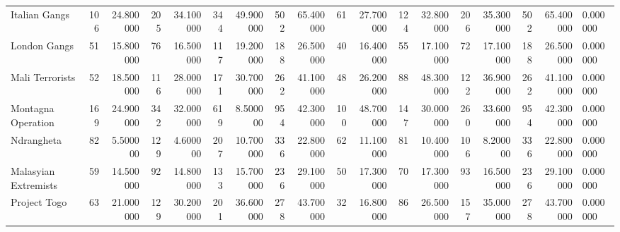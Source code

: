 \begin{tabular}{lrrrrrrrrrrrrrrrrl}
Italian Gangs & 106 & 24.800000 & 205 & 34.100000 & 344 & 49.900000 & 502 & 65.400000 & 61 & 27.700000 & 124 & 32.800000 & 206 & 35.300000 & 502 & 65.400000 & 0.000000 \\
London Gangs & 51 & 15.800000 & 76 & 16.500000 & 117 & 19.200000 & 188 & 26.500000 & 40 & 16.400000 & 55 & 17.100000 & 72 & 17.100000 & 188 & 26.500000 & 0.000000 \\
Mali Terrorists & 52 & 18.500000 & 116 & 28.000000 & 171 & 30.700000 & 262 & 41.100000 & 48 & 26.200000 & 88 & 48.300000 & 122 & 36.900000 & 262 & 41.100000 & 0.000000 \\
Montagna Operation & 169 & 24.900000 & 342 & 32.000000 & 619 & 8.500000 & 954 & 42.300000 & 100 & 48.700000 & 147 & 30.000000 & 260 & 33.600000 & 954 & 42.300000 & 0.000000 \\
Ndrangheta & 82 & 5.500000 & 129 & 4.600000 & 207 & 10.700000 & 336 & 22.800000 & 62 & 11.100000 & 81 & 10.400000 & 106 & 8.200000 & 336 & 22.800000 & 0.000000 \\
Malasyian Extremists & 59 & 14.500000 & 92 & 14.800000 & 133 & 15.700000 & 236 & 29.100000 & 50 & 17.300000 & 70 & 17.300000 & 93 & 16.500000 & 236 & 29.100000 & 0.000000 \\
Project Togo & 63 & 21.000000 & 129 & 30.200000 & 201 & 36.600000 & 278 & 43.700000 & 32 & 16.800000 & 86 & 26.500000 & 157 & 35.000000 & 278 & 43.700000 & 0.000000 \\
\end{tabular}
